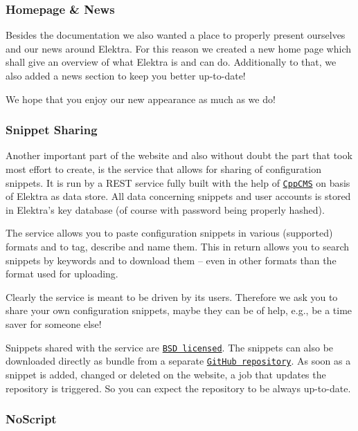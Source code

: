 \subsubsection*{Homepage \& News}

Besides the documentation we also wanted a place to properly present ourselves and our news around Elektra. For this reason we created a new home page which shall give an overview of what Elektra is and can do. Additionally to that, we also added a news section to keep you better up-\/to-\/date!

We hope that you enjoy our new appearance as much as we do!

\subsubsection*{Snippet Sharing}

Another important part of the website and also without doubt the part that took most effort to create, is the service that allows for sharing of configuration snippets. It is run by a R\+E\+ST service fully built with the help of \href{http://cppcms.com/}{\tt Cpp\+C\+MS} on basis of Elektra as data store. All data concerning snippets and user accounts is stored in Elektra’s key database (of course with password being properly hashed).

The service allows you to paste configuration snippets in various (supported) formats and to tag, describe and name them. This in return allows you to search snippets by keywords and to download them -- even in other formats than the format used for uploading.

Clearly the service is meant to be driven by its users. Therefore we ask you to share your own configuration snippets, maybe they can be of help, e.\+g., be a time saver for someone else!

Snippets shared with the service are \href{https://www.libelektra.org/devgettingstarted/license}{\tt B\+SD licensed}. The snippets can also be downloaded directly as bundle from a separate \href{https://github.com/ElektraInitiative/snippets}{\tt Git\+Hub repository}. As soon as a snippet is added, changed or deleted on the website, a job that updates the repository is triggered. So you can expect the repository to be always up-\/to-\/date.

\subsubsection*{No\+Script}

